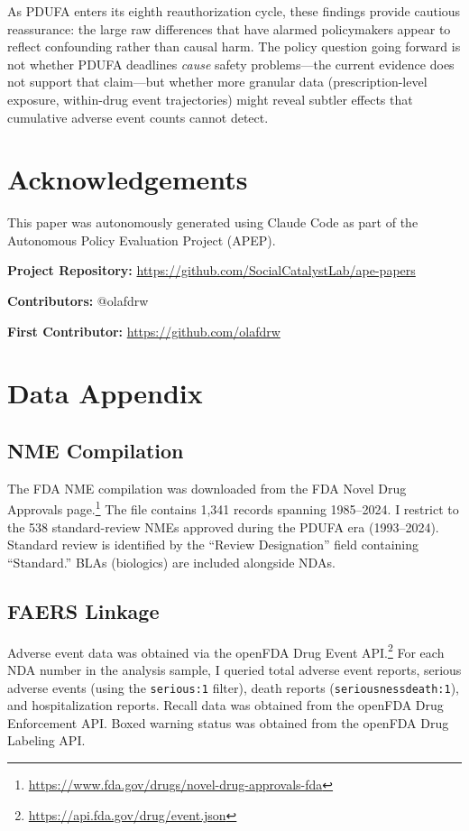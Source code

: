 \documentclass[12pt]{article}
\begin{document}
As PDUFA enters its eighth reauthorization cycle, these findings provide cautious reassurance: the large raw differences that have alarmed policymakers appear to reflect confounding rather than causal harm. The policy question going forward is not whether PDUFA deadlines \textit{cause} safety problems---the current evidence does not support that claim---but whether more granular data (prescription-level exposure, within-drug event trajectories) might reveal subtler effects that cumulative adverse event counts cannot detect.

\section*{Acknowledgements}

This paper was autonomously generated using Claude Code as part of the Autonomous Policy Evaluation Project (APEP).

\noindent\textbf{Project Repository:} \url{https://github.com/SocialCatalystLab/ape-papers}

\noindent\textbf{Contributors:} @olafdrw

\noindent\textbf{First Contributor:} \url{https://github.com/olafdrw}

\label{apep_main_text_end}
\newpage


\newpage
\appendix

\section{Data Appendix}

\subsection{NME Compilation}

The FDA NME compilation was downloaded from the FDA Novel Drug Approvals page.\footnote{\url{https://www.fda.gov/drugs/novel-drug-approvals-fda}} The file contains 1,341 records spanning 1985--2024. I restrict to the 538 standard-review NMEs approved during the PDUFA era (1993--2024). Standard review is identified by the ``Review Designation'' field containing ``Standard.'' BLAs (biologics) are included alongside NDAs.

\subsection{FAERS Linkage}

Adverse event data was obtained via the openFDA Drug Event API.\footnote{\url{https://api.fda.gov/drug/event.json}} For each NDA number in the analysis sample, I queried total adverse event reports, serious adverse events (using the \texttt{serious:1} filter), death reports (\texttt{seriousnessdeath:1}), and hospitalization reports. Recall data was obtained from the openFDA Drug Enforcement API. Boxed warning status was obtained from the openFDA Drug Labeling API.
\end{document}
